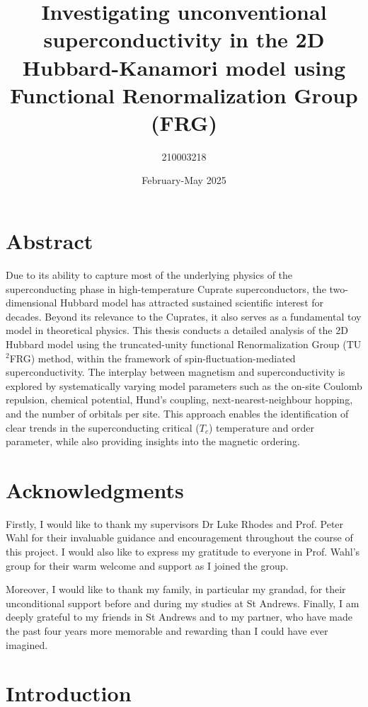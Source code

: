 \documentclass[11pt]{article}
\title{Investigating unconventional superconductivity in the 2D Hubbard-Kanamori model using Functional Renormalization Group (FRG)}
\author{210003218}
\date{February-May 2025}
\begin{document}
\maketitle
\tableofcontents 

\newpage 

\section{Abstract}



Due to its ability to capture most of the underlying physics of the superconducting phase in high-temperature Cuprate superconductors\cite{dagotto1994correlated},
the two-dimensional Hubbard model has attracted sustained scientific interest for decades. 
Beyond its relevance to the Cuprates, it also serves as a fundamental toy model in theoretical physics. 
This thesis conducts a detailed analysis of the 2D Hubbard model using the truncated-unity functional Renormalization Group (TU$^2$FRG) method,
within the framework of spin-fluctuation-mediated superconductivity.  The interplay between magnetism and superconductivity is explored 
by systematically varying model parameters such as the on-site Coulomb repulsion, chemical potential, Hund's coupling, next-nearest-neighbour hopping, and the number of orbitals per
site. This approach enables the identification of clear trends in the superconducting critical ($T_c$) temperature and order parameter, while also
providing insights into the magnetic ordering.


\section{Acknowledgments}

Firstly, I would like to thank my supervisors Dr Luke Rhodes and Prof. Peter Wahl for their invaluable guidance and encouragement throughout the course of this 
project. I would also like to express my gratitude to everyone in Prof. Wahl's group for their warm welcome 
and support as I joined the group. \par
\medskip
\noindent Moreover, I would like to thank my family, in particular my grandad, for their unconditional support before and during 
my studies at St Andrews. Finally, I am deeply grateful to my friends in St Andrews and to my partner, who have
made the past four years more memorable and rewarding than I could have ever imagined.  


\section{Introduction}
\end{document}
